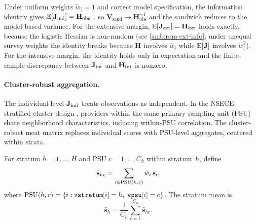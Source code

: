 \begin{remark}
\label{smc:rem-equal-weights}
  Under uniform weights $\tilde{w}_i = 1$ and correct model
  specification, the information identity gives
  $\mathbb{E}[\mathbf{J}_{\textup{ind}}] = \mathbf{H}_{\mathrm{obs}}$
  \citep[see][for the pseudo-posterior analogue]{WilliamsSavitsky2021}, so
  $\mathbf{V}_{\mathrm{sand}} \to \mathbf{H}_{\mathrm{obs}}^{-1}$ and
  the sandwich reduces to the model-based variance.  For the extensive
  margin, $\mathbb{E}[\mathbf{J}_{\textup{ext}}] = \mathbf{H}_{\textup{ext}}$
  holds exactly, because the logistic Hessian is non-random (see
  \cref{smb:rem-ext-info}; under unequal survey weights the identity
  breaks because $\mathbf{H}$ involves $\tilde{w}_i$ while
  $\mathbb{E}[\mathbf{J}]$ involves $\tilde{w}_i^2$).  For the intensive margin, the identity holds only
  in expectation and the finite-sample discrepancy between
  $\mathbf{J}_{\textup{int}}$ and $\mathbf{H}_{\textup{int}}$ is
  nonzero.
\end{remark}


\paragraph{Cluster-robust aggregation.}
The individual-level $\mathbf{J}_{\textup{ind}}$ treats observations as
independent.  In the NSECE stratified cluster design
\citep{NSECEProjectTeam2022}, providers within
the same primary sampling unit (PSU) share neighborhood
characteristics, inducing within-PSU correlation.  The cluster-robust
meat matrix replaces individual scores with PSU-level aggregates,
centered within strata.

\begin{definition}
\label{smc:def-psu-scores}
  For stratum $h = 1,\ldots,H$ and PSU $c = 1,\ldots,C_h$ within
  stratum~$h$, define
  \begin{equation}\label{smc:eq-s-psu}
    \bar{\mathbf{s}}_{hc}
    = \sum_{i \in \textup{PSU}(h,c)} \tilde{w}_i\,\mathbf{s}_i,
  \end{equation}
  where $\textup{PSU}(h,c) = \{i : \texttt{vstratum}[i]=h,\;
  \texttt{vpsu}[i]=c\}$.  The stratum mean is
  \begin{equation}\label{smc:eq-s-stratum}
    \bar{\mathbf{s}}_h
    = \frac{1}{C_h}\sum_{c=1}^{C_h}\bar{\mathbf{s}}_{hc}.
  \end{equation}
\end{definition}

